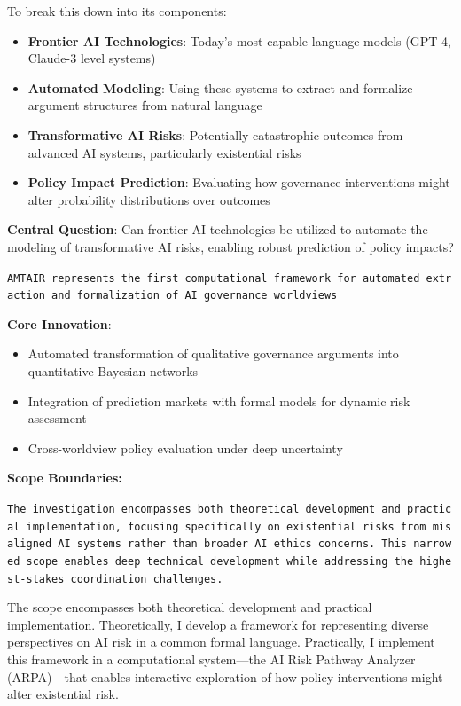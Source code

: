 \documentclass[12pt,a4paper]{report}
\providecommand{\tightlist}{%
  \setlength{\itemsep}{0pt}\setlength{\parskip}{0pt}}
\begin{document}
To break this down into its components:

\begin{itemize}
\tightlist
\item
  \textbf{Frontier AI Technologies}: Today's most capable language
  models (GPT-4, Claude-3 level systems)
\item
  \textbf{Automated Modeling}: Using these systems to extract and
  formalize argument structures from natural language
\item
  \textbf{Transformative AI Risks}: Potentially catastrophic outcomes
  from advanced AI systems, particularly existential risks
\item
  \textbf{Policy Impact Prediction}: Evaluating how governance
  interventions might alter probability distributions over outcomes
\end{itemize}

\textbf{Central Question}: Can frontier AI technologies be utilized to
automate the modeling of transformative AI risks, enabling robust
prediction of policy impacts?

\texttt{AMTAIR\ represents\ the\ first\ computational\ framework\ for\ automated\ extraction\ and\ formalization\ of\ AI\ governance\ worldviews}

\textbf{Core Innovation}:

\begin{itemize}
\tightlist
\item
  Automated transformation of qualitative governance arguments into
  quantitative Bayesian networks
\item
  Integration of prediction markets with formal models for dynamic risk
  assessment
\item
  Cross-worldview policy evaluation under deep uncertainty
\end{itemize}

\textbf{Scope Boundaries:}

\texttt{The\ investigation\ encompasses\ both\ theoretical\ development\ and\ practical\ implementation,\ focusing\ specifically\ on\ existential\ risks\ from\ misaligned\ AI\ systems\ rather\ than\ broader\ AI\ ethics\ concerns.\ This\ narrowed\ scope\ enables\ deep\ technical\ development\ while\ addressing\ the\ highest-stakes\ coordination\ challenges.}

The scope encompasses both theoretical development and practical
implementation. Theoretically, I develop a framework for representing
diverse perspectives on AI risk in a common formal language.
Practically, I implement this framework in a computational system---the
AI Risk Pathway Analyzer (ARPA)---that enables interactive exploration
of how policy interventions might alter existential risk.
\end{document}
